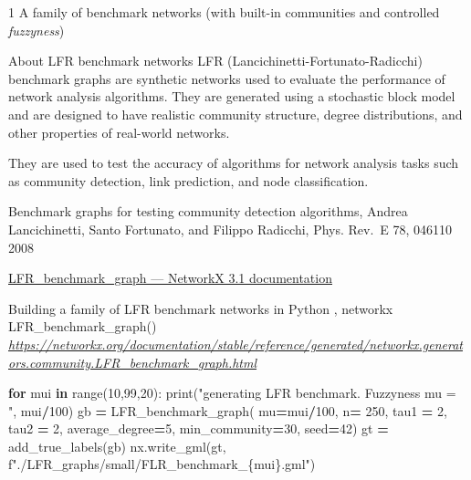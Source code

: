 \documentclass[
  ignorenonframetext,
]{beamer}
\newenvironment{Shaded}{\begin{snugshade}}{\end{snugshade}}
\newcommand{\BuiltInTok}[1]{#1}
\newcommand{\ControlFlowTok}[1]{\textcolor[rgb]{0.13,0.29,0.53}{\textbf{#1}}}
\newcommand{\DecValTok}[1]{\textcolor[rgb]{0.00,0.00,0.81}{#1}}
\newcommand{\KeywordTok}[1]{\textcolor[rgb]{0.13,0.29,0.53}{\textbf{#1}}}
\newcommand{\NormalTok}[1]{#1}
\newcommand{\OperatorTok}[1]{\textcolor[rgb]{0.81,0.36,0.00}{\textbf{#1}}}
\newcommand{\SpecialCharTok}[1]{\textcolor[rgb]{0.00,0.00,0.00}{#1}}
\newcommand{\SpecialStringTok}[1]{\textcolor[rgb]{0.31,0.60,0.02}{#1}}
\newcommand{\StringTok}[1]{\textcolor[rgb]{0.31,0.60,0.02}{#1}}
\begin{document}
\begin{frame}[fragile]{1 A family of benchmark networks (with built-in
communities and controlled \emph{fuzzyness})}
\protect\hypertarget{a-family-of-benchmark-networks-with-built-in-communities-and-controlled-fuzzyness}{}
\begin{block}{About LFR benchmark networks}
\protect\hypertarget{about-lfr-benchmark-networks}{}
LFR (Lancichinetti-Fortunato-Radicchi) benchmark graphs are synthetic
networks used to evaluate the performance of network analysis
algorithms. They are generated using a stochastic block model and are
designed to have realistic community structure, degree distributions,
and other properties of real-world networks.

They are used to test the accuracy of algorithms for network analysis
tasks such as community detection, link prediction, and node
classification.

Benchmark graphs for testing community detection algorithms, Andrea
Lancichinetti, Santo Fortunato, and Filippo Radicchi, Phys. Rev.~E 78,
046110 2008

\href{https://networkx.org/documentation/stable/reference/generated/networkx.generators.community.LFR_benchmark_graph.html}{LFR\_benchmark\_graph
--- NetworkX 3.1 documentation}
\end{block}

\begin{block}{Building a family of LFR benchmark networks}
\protect\hypertarget{building-a-family-of-lfr-benchmark-networks}{}
in Python , networkx LFR\_benchmark\_graph()
\href{https://networkx.org/documentation/stable/reference/generated/networkx.generators.community.LFR_benchmark_graph.html}{\emph{https://networkx.org/documentation/stable/reference/generated/networkx.generators.community.LFR\_benchmark\_graph.html}}

\begin{Shaded}
\begin{Highlighting}[]
\ControlFlowTok{for}\NormalTok{ mui }\KeywordTok{in} \BuiltInTok{range}\NormalTok{(}\DecValTok{10}\NormalTok{,}\DecValTok{99}\NormalTok{,}\DecValTok{20}\NormalTok{):}
    \BuiltInTok{print}\NormalTok{(}\StringTok{"generating LFR benchmark. Fuzzyness mu = "}\NormalTok{, mui}\OperatorTok{/}\DecValTok{100}\NormalTok{)}
\NormalTok{    gb }\OperatorTok{=}\NormalTok{ LFR\_benchmark\_graph( mu}\OperatorTok{=}\NormalTok{mui}\OperatorTok{/}\DecValTok{100}\NormalTok{, }
\NormalTok{        n}\OperatorTok{=} \DecValTok{250}\NormalTok{,  }
\NormalTok{        tau1 }\OperatorTok{=} \DecValTok{2}\NormalTok{, }
\NormalTok{        tau2 }\OperatorTok{=} \DecValTok{2}\NormalTok{, }
\NormalTok{        average\_degree}\OperatorTok{=}\DecValTok{5}\NormalTok{, }
\NormalTok{        min\_community}\OperatorTok{=}\DecValTok{30}\NormalTok{, }
\NormalTok{        seed}\OperatorTok{=}\DecValTok{42}\NormalTok{)}
\NormalTok{    gt }\OperatorTok{=}\NormalTok{ add\_true\_labels(gb)}
\NormalTok{    nx.write\_gml(gt, }\SpecialStringTok{f"./LFR\_graphs/small/FLR\_benchmark\_}\SpecialCharTok{\{}\NormalTok{mui}\SpecialCharTok{\}}\SpecialStringTok{.gml"}\NormalTok{)}
\end{Highlighting}
\end{Shaded}


\end{block}
\end{frame}
\end{document}
